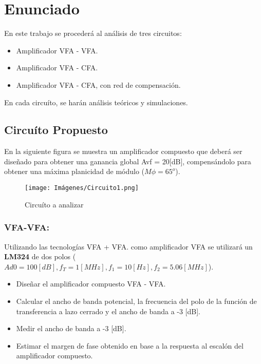 \section{Enunciado}
En este trabajo se procederá al análisis de tres circuitos:

\begin{itemize}
    \item Amplificador VFA - VFA.
    \item Amplificador VFA - CFA.
    \item Amplificador VFA - CFA, con red de compensación.
\end{itemize}

En cada circuíto, se harán análisis teóricos y simulaciones.

\subsection{Circuíto Propuesto}
En la siguiente figura se muestra un amplificador compuesto que deberá ser diseñado para obtener una ganancia global Avf = 20[dB], compensándolo para obtener una máxima planicidad de módulo ($M\phi = 65^o$).

    \begin{figure}[ht]
    	\centering
    	\texttt{[image: Imágenes/Circuito1.png]}
    	\caption{Circuíto a analizar}
    \end{figure}

\subsubsection{VFA-VFA:}
 Utilizando las tecnologías VFA + VFA. como amplificador VFA se utilizará un \textbf{LM324} de dos polos ($Ad0 = 100 [dB], f_T = 1 [MHz], f_1 = 10[Hz], f_2 = 5.06 [MHz]$).\\
 
 \begin{itemize}
     \item Diseñar el amplificador compuesto VFA - VFA.
     \item Calcular el ancho de banda potencial, la frecuencia del polo de la función de transferencia a lazo cerrado y el ancho de banda a -3 [dB].
     \item Medir el ancho de banda a -3 [dB].
     \item Estimar el margen de fase obtenido en base a la respuesta al escalón del amplificador compuesto.
 \end{itemize}


